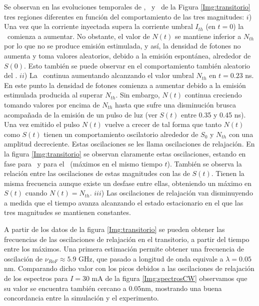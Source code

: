 		Se observan en las evoluciones temporales de \n, \s\ y \chirp\ de la Figura \ref{Img:transitorio} tres regiones diferentes en función del comportamiento de las tres magnitudes: $i$) Una vez que la corriente inyectada supera la corriente umbral $I_{th}$ (en $t=0$) la \n\ comienza a aumentar. No obstante, el valor de $N(t)$ se mantiene inferior a $N_{th}$ por lo que no se produce emisión estimulada, y así, la densidad de fotones no aumenta y toma valores aleatorios, debido a la emisión espontánea, alrededor de $S(0)$. Esto también se puede observar en el comportamiento también aleatorio del \chirp. $ii$) La \n\ continua aumentando alcanzando el valor umbral $N_{th}$ en $t = 0.23$ ns. En este punto la densidad de fotones comienza a aumentar debido a la emisión estimulada producida al superar $N_{th}$. Sin embargo, $N(t)$ continua creciendo tomando valores por encima de $N_{th}$ hasta que sufre una disminución brusca acompañada de la emisión de un pulso de luz (ver $S(t)$ entre 0.35 y 0.45 ns). Una vez emitido el pulso $N(t)$ vuelve a crecer de tal forma que tanto $N(t)$ como $S(t)$ tienen un comportamiento oscilatorio alrededor de $S_0$ y $N_{th}$ con una amplitud decreciente. Estas oscilaciones se les llama oscilaciones de relajación. En la figura \ref{Img:transitorio} se observan claramente estas oscilaciones, estando en fase para \n\ y para el \chirp\ (máximos en el mismo tiempo $t$). También se observa la relación entre las oscilaciones de estas magnitudes con las de $S(t)$. Tienen la misma frecuencia aunque existe un desfase entre ellas, obteniendo un máximo en $S(t)$ cuando $N(t) = N_{th}$. $iii$) Las oscilaciones de relajación van disminuyendo a medida que el tiempo avanza alcanzando el estado estacionario en el que las tres magnitudes se mantienen constantes.

		A partir de los datos de la figura \ref{Img:transitorio} se pueden obtener las frecuencias de las oscilaciones de relajación en el transitorio, a partir del tiempo entre los máximos. Una primera estimación permite obtener una frecuencia de oscilación de $\nu_{RoF} \approx 5.9$ GHz, que pasado a longitud de onda equivale a $\lambda = 0.05$ nm. Comparando dicho valor con los picos debidos a las oscilaciones de relajación de los espectros para $I = 30$ mA de la figura \ref{Img:spectrosCW} observamos que su valor se encuentra también cercano a $0.05$nm, mostrando una buena concordancia entre la simulación y el experimento.
